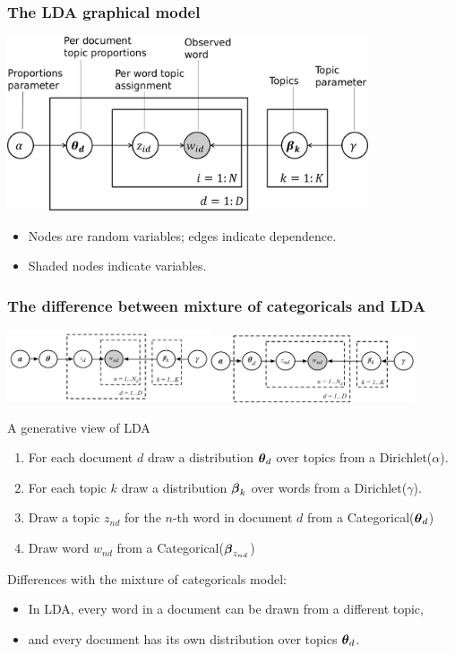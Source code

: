 \begin{frame}
\frametitle{The LDA graphical model}

\centerline{\includegraphics[width=0.8\textwidth]{LDA_model_annotated}}

\begin{itemize}
\item Nodes are random variables; edges indicate dependence.
\item Shaded nodes indicate  variables.
\end{itemize}

\end{frame}


\begin{frame}
\frametitle{The difference between mixture of categoricals and LDA}

\centerline{\includegraphics[width=0.45\textwidth]{bayes_mix_categorical_model}\hspace*{2ex}\includegraphics[width=0.45\textwidth]{lda2}}

A generative view of LDA
\begin{enumerate}
\item For each document $d$ draw a distribution $\boldsymbol{\theta}_d$ over
  topics from a Dirichlet($\alpha$).
\item For each topic $k$ draw a distribution $\boldsymbol{\beta}_k$ over words
  from a Dirichlet($\gamma$). 
\item Draw a topic $z_{nd}$ for the $n$-th word in document $d$ from a
  Categorical($\boldsymbol{\theta}_d$)
\item Draw word $w_{nd}$ from a Categorical($\boldsymbol{\beta}_{z_{nd}}$)
\end{enumerate}

Differences with the mixture of categoricals model:
\begin{itemize}
\item In LDA, every word in a document can be drawn from a different
  topic, 
\item and every document has its own distribution over topics $\boldsymbol{\theta}_d$.
\end{itemize}

\end{frame}


